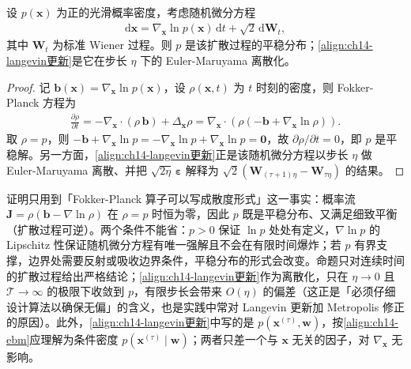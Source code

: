 \documentclass[../../main.tex]{subfiles}
\begin{document}
\begin{proposition}\label{proposition:ch14-langevin平稳}
设 $p(\bm{x})$ 为正的光滑概率密度，考虑随机微分方程
\begin{align*}
\mathrm{d}\bm{x}=\nabla_{\bm{x}}\ln p(\bm{x})\,\mathrm{d}t+\sqrt{2}\,\mathrm{d}\bm{W}_{t},
\end{align*}
其中 $\bm{W}_{t}$ 为标准 Wiener 过程。则 $p$ 是该扩散过程的平稳分布；\eqref{align:ch14-langevin更新}是它在步长 $\eta$ 下的 Euler-Maruyama 离散化。
\end{proposition}

\begin{proof}
记 $\bm{b}(\bm{x})=\nabla_{\bm{x}}\ln p(\bm{x})$，设 $\rho(\bm{x},t)$ 为 $t$ 时刻的密度，则 Fokker-Planck 方程为
\begin{align*}
\frac{\partial\rho}{\partial t}=-\nabla_{\bm{x}}\cdot\left(\rho\,\bm{b}\right)+\Delta_{\bm{x}}\rho=\nabla_{\bm{x}}\cdot\left(\rho\left(-\bm{b}+\nabla_{\bm{x}}\ln\rho\right)\right).
\end{align*}
取 $\rho=p$，则 $-\bm{b}+\nabla_{\bm{x}}\ln p=-\nabla_{\bm{x}}\ln p+\nabla_{\bm{x}}\ln p=\bm{0}$，故 $\partial\rho/\partial t=0$，即 $p$ 是平稳解。另一方面，\eqref{align:ch14-langevin更新}正是该随机微分方程以步长 $\eta$ 做 Euler-Maruyama 离散、并把 $\sqrt{2\eta}\,\bm{\varepsilon}$ 解释为 $\sqrt{2}\left(\bm{W}_{(\tau+1)\eta}-\bm{W}_{\tau\eta}\right)$ 的结果。
\end{proof}

\begin{remark}证明只用到「Fokker-Planck 算子可以写成散度形式」这一事实：概率流 $\bm{J}=\rho\left(\bm{b}-\nabla\ln\rho\right)$ 在 $\rho=p$ 时恒为零，因此 $p$ 既是平稳分布、又满足细致平衡（扩散过程可逆）。两个条件不能省：$p>0$ 保证 $\ln p$ 处处有定义，$\nabla\ln p$ 的 Lipschitz 性保证随机微分方程有唯一强解且不会在有限时间爆炸；若 $p$ 有界支撑，边界处需要反射或吸收边界条件，平稳分布的形式会改变。命题只对连续时间的扩散过程给出严格结论；\eqref{align:ch14-langevin更新}作为离散化，只在 $\eta\to0$ 且 $\mathcal{T}\to\infty$ 的极限下收敛到 $p$，有限步长会带来 $O(\eta)$ 的偏差（这正是「必须仔细设计算法以确保无偏」的含义，也是实践中常对 Langevin 更新加 Metropolis 修正的原因）。此外，\eqref{align:ch14-langevin更新}中写的是 $p\!\left(\bm{x}^{(\tau)},\bm{w}\right)$，按\eqref{align:ch14-ebm}应理解为条件密度 $p\!\left(\bm{x}^{(\tau)}\mid\bm{w}\right)$；两者只差一个与 $\bm{x}$ 无关的因子，对 $\nabla_{\bm{x}}$ 无影响。
\end{remark}
\end{document}
